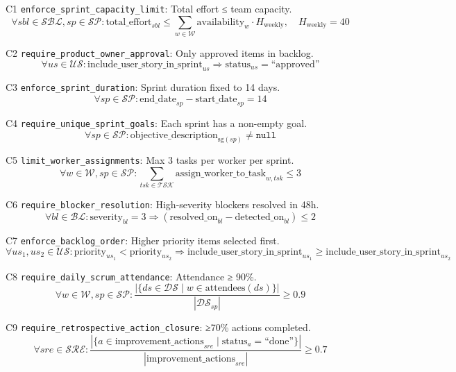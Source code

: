 \documentclass[12pt]{article}
\begin{document}
    \item[C1] \texttt{enforce\_sprint\_capacity\_limit}: Total effort ≤ team capacity.
    \[
    \forall sbl \in \mathcal{SBL}, sp \in \mathcal{SP}: \text{total\_effort}_{sbl} \leq \sum_{w \in \mathcal{W}} \text{availability}_w \cdot H_{\text{weekly}}, \quad H_{\text{weekly}} = 40
    \]

    \item[C2] \texttt{require\_product\_owner\_approval}: Only approved items in backlog.
    \[
    \forall us \in \mathcal{US}: \text{include\_user\_story\_in\_sprint}_{us} \Rightarrow \text{status}_{us} = \text{``approved''}
    \]

    \item[C3] \texttt{enforce\_sprint\_duration}: Sprint duration fixed to 14 days.
    \[
    \forall sp \in \mathcal{SP}: \text{end\_date}_{sp} - \text{start\_date}_{sp} = 14
    \]

    \item[C4] \texttt{require\_unique\_sprint\_goals}: Each sprint has a non-empty goal.
    \[
    \forall sp \in \mathcal{SP}: \text{objective\_description}_{\text{sg}(sp)} \neq \texttt{null}
    \]

    \item[C5] \texttt{limit\_worker\_assignments}: Max 3 tasks per worker per sprint.
    \[
    \forall w \in \mathcal{W}, sp \in \mathcal{SP}: \sum_{tsk \in \mathcal{TSK}} \text{assign\_worker\_to\_task}_{w,tsk} \leq 3
    \]

    \item[C6] \texttt{require\_blocker\_resolution}: High-severity blockers resolved in 48h.
    \[
    \forall bl \in \mathcal{BL}: \text{severity}_{bl} = 3 \Rightarrow (\text{resolved\_on}_{bl} - \text{detected\_on}_{bl}) \leq 2
    \]

    \item[C7] \texttt{enforce\_backlog\_order}: Higher priority items selected first.
    \[
    \forall us_1, us_2 \in \mathcal{US}: \text{priority}_{us_1} < \text{priority}_{us_2} \Rightarrow \text{include\_user\_story\_in\_sprint}_{us_1} \geq \text{include\_user\_story\_in\_sprint}_{us_2}
    \]

    \item[C8] \texttt{require\_daily\_scrum\_attendance}: Attendance ≥ 90\%.
    \[
    \forall w \in \mathcal{W}, sp \in \mathcal{SP}: \frac{|\{ ds \in \mathcal{DS} \mid w \in \text{attendees}(ds) \}|}{|\mathcal{DS}_{sp}|} \geq 0.9
    \]

    \item[C9] \texttt{require\_retrospective\_action\_closure}: ≥70\% actions completed.
    \[
    \forall sre \in \mathcal{SRE}: \frac{|\{ a \in \text{improvement\_actions}_{sre} \mid \text{status}_a = \text{``done''} \}|}{|\text{improvement\_actions}_{sre}|} \geq 0.7
    \]
\end{document}
